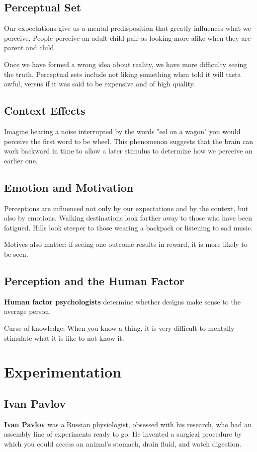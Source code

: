\documentclass[12pt]{article}
\begin{document}
\subsection*{Perceptual Set}
Our expectations give us a mental predisposition that greatly influences what we perceive. People perceive an adult-child pair as looking more alike when they are parent and child.

Once we have formed a wrong idea about reality, we have more difficulty seeing the truth. Perceptual sets include not liking something when told it will tasta awful, versus if it was said to be expensive and of high quality.

\subsection*{Context Effects}
Imagine hearing a noise interrupted by the words "eel on a wagon" you would perceive the first word to be wheel. This phenomenon suggests that the brain can work backward in time to allow a later stimulus to determine how we perceive an earlier one.

\subsection*{Emotion and Motivation}
Perceptions are influenced not only by our expectations and by the context, but also by emotions. Walking destinations look farther away to those who have been fatigued. Hills look steeper to those wearing a backpack or listening to sad music.

Motives also matter: if seeing one outcome results in reward, it is more likely to be seen.

\subsection*{Perception and the Human Factor}
\textbf{Human factor psychologists} determine whether designs make sense to the average person.

Curse of knowledge: When you know a thing, it is very difficult to mentally stimulate what it is like to not know it.

\section*{Experimentation}
\subsection*{Ivan Pavlov}
{\bf Ivan Pavlov} was a Russian physiologist, obsessed with his research, who had an assembly line of experiments ready to go. He invented a surgical procedure by which you could access an animal's stomach, drain fluid, and watch digestion.
\end{document}
